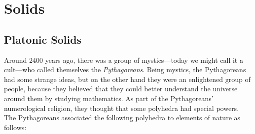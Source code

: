 \newpage



\section{Solids}

\subsection{Platonic Solids}

Around 2400 years ago, there was a group of mystics---today we might
call it a cult---who called themselves the
\textit{Pythagoreans}. Being
mystics, the Pythagoreans had some strange ideas, but on the other
hand they were an enlightened group of people, because they believed
that they could better understand the universe around them by studying
mathematics. As part of the Pythagoreans' numerological religion, they
thought that some polyhedra had special powers. The Pythagoreans
associated the following polyhedra to elements of nature as follows:
